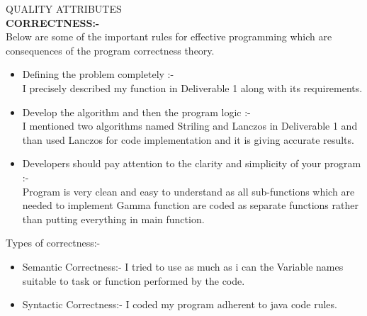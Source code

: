 \documentclass[10pt]{article}
\begin{document}
 \newpage
{\huge QUALITY ATTRIBUTES} \\
\newline
 \textbf{CORRECTNESS:-} \\
 Below are some of the important rules for effective programming which are consequences of the program correctness theory.
 \begin{itemize} [noitemsep,topsep=0pt]
 	\item Defining the problem completely :- \\ I precisely described my function in Deliverable 1 along with its requirements.
 	\item Develop the algorithm and then the program logic :- \\ I mentioned two algorithms named Striling and Lanczos in Deliverable 1 and than used Lanczos for code implementation and it is giving accurate results.
 	\item Developers should pay attention to the clarity and simplicity of your program :- \\ Program is very clean and easy to understand as all sub-functions which are needed to implement Gamma function are coded as separate functions rather than putting everything in main function.
 \end{itemize}
 Types of correctness:-
 \begin{itemize}
 	\item Semantic Correctness:- I tried to use as much as i can the Variable names suitable to task or function performed by the code.
 	\item Syntactic Correctness:- I coded my program adherent to java code rules.	
 \end{itemize}
\end{document}
